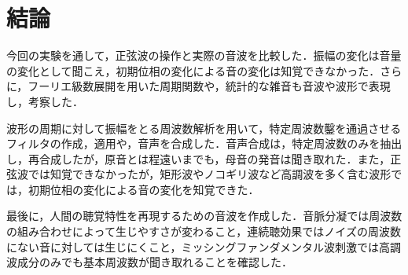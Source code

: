 \chapter{結論}
今回の実験を通して，正弦波の操作と実際の音波を比較した．振幅の変化は音量の変化として聞こえ，初期位相の変化による音の変化は知覚できなかった．さらに，フーリエ級数展開を用いた周期関数や，統計的な雑音も音波や波形で表現し，考察した．\par
波形の周期に対して振幅をとる周波数解析を用いて，特定周波数鑿を通過させるフィルタの作成，適用や，音声を合成した．音声合成は，特定周波数のみを抽出し，再合成したが，原音とは程遠いまでも，母音の発音は聞き取れた．また，正弦波では知覚できなかったが，矩形波やノコギリ波など高調波を多く含む波形では，初期位相の変化による音の変化を知覚できた．\par
最後に，人間の聴覚特性を再現するための音波を作成した．音脈分凝では周波数の組み合わせによって生じやすさが変わること，連続聴効果ではノイズの周波数にない音に対しては生じにくこと，ミッシングファンダメンタル波刺激では高調波成分のみでも基本周波数が聞き取れることを確認した．